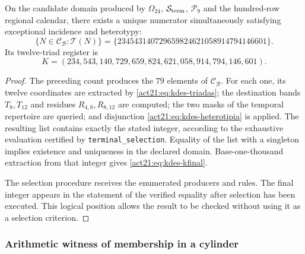 \begin{theorem}
On the candidate domain produced by
$\Omega_{24}$, $\mathcal S_{\rm term}$, $\mathcal P_9$ and the hundred-row
regional calendar, there exists a unique numerator simultaneously satisfying
exceptional incidence and heterotypy:
\[
 \{N\in\mathcal C_{\mathcal B}:\mathcal T(N)\}
 =\{234543140729659824621058914794146601\}.
\]
Its twelve-triad register is
\begin{equation}
 K=(234,543,140,729,659,824,621,058,914,794,146,601).
 \label{act21:eq:kdes-kfinal}
\end{equation}
\end{theorem}
\begin{proof}
The preceding count produces the $79$ elements of
$\mathcal C_{\mathcal B}$. For each one, its twelve
coordinates are extracted by \eqref{act21:eq:kdes-triadas}; the destination bands
$T_8,T_{12}$ and residues $R_{4,8},R_{8,12}$ are computed; the
two masks of the temporal repertoire are queried; and disjunction
\eqref{act21:eq:kdes-heterotipia} is applied. The resulting list contains exactly
the stated integer, according to the exhaustive evaluation certified by
\texttt{terminal\_selection}. Equality of the list with a singleton
implies existence and uniqueness in the declared domain. Base-one-thousand
extraction from that integer gives \eqref{act21:eq:kdes-kfinal}.

The selection procedure receives the enumerated producers and rules.
The final integer appears in the statement of the verified
equality after selection has been executed. This logical position
allows the result to be checked without using it as a selection criterion.
\end{proof}

\subsubsection{Arithmetic witness of membership in a cylinder}

